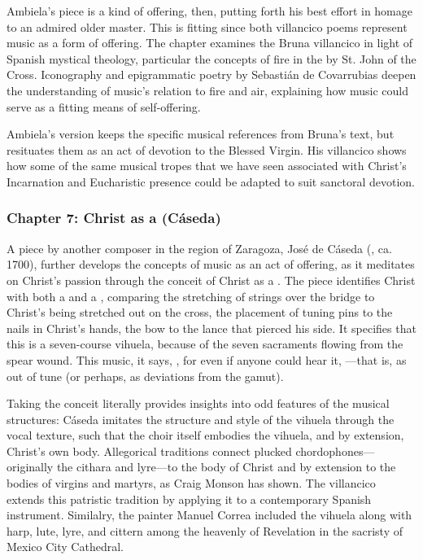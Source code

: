 \documentclass{vcbook-proposal}
\begin{document}
Ambiela's piece is a kind of offering, then, putting forth his best effort in homage to an admired older master.
This is fitting since both villancico poems represent music as a form of offering.
The chapter examines the Bruna villancico in light of Spanish mystical theology, particular the concepts of fire in the  by St. John of the Cross.
Iconography and epigrammatic poetry by Sebastián de Covarrubias deepen the understanding of music's relation to fire and air, explaining how music could serve as a fitting means of self-offering.

Ambiela's version keeps the specific musical references from Bruna's text, but resituates them as an act of devotion to the Blessed Virgin.
His villancico shows how some of the same musical tropes that we have seen associated with Christ's Incarnation and Eucharistic presence could be adapted to suit sanctoral devotion. 

\subsubsection{Chapter 7: Christ as a  (Cáseda)}

A piece by another composer in the region of Zaragoza, José de Cáseda (, ca. 1700), further develops the concepts of music as an act of offering, as it meditates on Christ's passion through the conceit of Christ as a . 
The piece identifies Christ with both a  and a , comparing the stretching of strings over the bridge to Christ's being stretched out on the cross, the placement of tuning pins to the nails in Christ's hands, the bow to the lance that pierced his side.
It specifies that this is a seven-course vihuela, because of the seven sacraments flowing from the spear wound.
This music, it says, , for even if anyone could hear it, ---that is, as out of tune (or perhaps, as  deviations from the gamut). 

Taking the conceit literally provides insights into odd features of the musical structures: Cáseda imitates the structure and style of the vihuela through the vocal texture, such that the choir itself embodies the vihuela, and by extension, Christ's own body.
Allegorical traditions connect plucked chordophones---originally the cithara and lyre---to the body of Christ and by extension to the bodies of virgins and martyrs, as Craig Monson has shown.%
  \autocite{Monson:DivasConvent}
The villancico extends this patristic tradition by applying it to a contemporary Spanish instrument.
Similalry, the painter Manuel Correa included the vihuela along with harp, lute, lyre, and cittern among the heavenly  of Revelation in the sacristy of Mexico City Cathedral.
\end{document}
